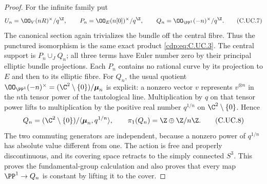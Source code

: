 \begin{proof}
For the infinite family put
\[
 U_n=\OO_V(nR)^\times/q^{\Z},\qquad
 P_n=\OO_E(n[0])^\times/q^{\Z},\qquad
 Q_n=\OO_{\PP^1}(-n)^\times/q^{\Z}.
\tag{C.UC.7}\label{cdp:eq:C.UC.7}
\]
The canonical section again trivializes the
bundle off the central fibre. Thus the punctured
isomorphism is the same exact product \eqref{cdp:eq:C.UC.3}.
The central support is $P_n\cup_J Q_n$;
all three terms have Euler number zero by their
principal elliptic bundle projections. Each
$P_n$ contains no rational curve by its
projection to $E$ and then to its elliptic
fibre. For $Q_n$, the usual quotient
$\OO_{\PP^1}(-n)^\times
=(\C^2\setminus\{0\})/\boldsymbol\mu_n$
is explicit: a nonzero vector $v$ represents
$v^{\otimes n}$ in the $n$th tensor power of
the tautological line. Multiplication by $q$
on that tensor power lifts to multiplication
by the positive real number $q^{1/n}$ on
$\C^2\setminus\{0\}$. Hence
\[
 Q_n=(\C^2\setminus\{0\})/
       \langle\boldsymbol\mu_n,q^{1/n}\rangle,
 \qquad
 \pi_1(Q_n)=\Z\oplus\Z/n\Z.
\tag{C.UC.8}\label{cdp:eq:C.UC.8}
\]
The two commuting generators are independent,
because a nonzero power of $q^{1/n}$ has
absolute value different from one. The action
is free and properly discontinuous, and its
covering space retracts to the simply connected
$S^3$. This proves the fundamental-group
calculation and also proves that every map
$\PP^1\to Q_n$ is constant by lifting it to
the cover.


\end{proof}
